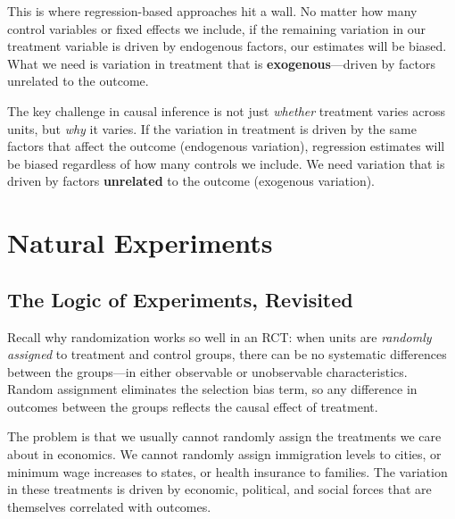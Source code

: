 \documentclass[
  letterpaper,
  DIV=11,
  numbers=noendperiod]{scrreprt}
\begin{document}
This is where regression-based approaches hit a wall. No matter how many
control variables or fixed effects we include, if the remaining
variation in our treatment variable is driven by endogenous factors, our
estimates will be biased. What we need is variation in treatment that is
\textbf{exogenous}---driven by factors unrelated to the outcome.

\begin{tcolorbox}[enhanced jigsaw, arc=.35mm, bottomrule=.15mm, bottomtitle=1mm, breakable, colback=white, colbacktitle=quarto-callout-warning-color!10!white, colframe=quarto-callout-warning-color-frame, coltitle=black, left=2mm, leftrule=.75mm, opacityback=0, opacitybacktitle=0.6, rightrule=.15mm, title=\textcolor{quarto-callout-warning-color}{\faExclamationTriangle}\hspace{0.5em}{Not All Variation is Created Equal}, titlerule=0mm, toprule=.15mm, toptitle=1mm]

The key challenge in causal inference is not just \emph{whether}
treatment varies across units, but \emph{why} it varies. If the
variation in treatment is driven by the same factors that affect the
outcome (endogenous variation), regression estimates will be biased
regardless of how many controls we include. We need variation that is
driven by factors \textbf{unrelated} to the outcome (exogenous
variation).

\end{tcolorbox}

\section{Natural Experiments}\label{natural-experiments}

\subsection{The Logic of Experiments,
Revisited}\label{the-logic-of-experiments-revisited}

Recall why randomization works so well in an RCT: when units are
\emph{randomly assigned} to treatment and control groups, there can be
no systematic differences between the groups---in either observable or
unobservable characteristics. Random assignment eliminates the selection
bias term, so any difference in outcomes between the groups reflects the
causal effect of treatment.

The problem is that we usually cannot randomly assign the treatments we
care about in economics. We cannot randomly assign immigration levels to
cities, or minimum wage increases to states, or health insurance to
families. The variation in these treatments is driven by economic,
political, and social forces that are themselves correlated with
outcomes.
\end{document}
